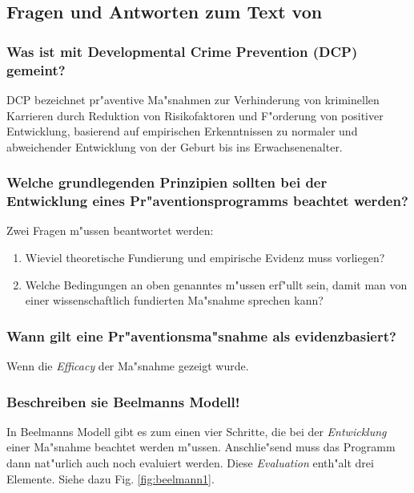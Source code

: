 \subsection{Fragen und Antworten zum Text von \textcite{beelmann_scientific_2012}}
\subsubsection{Was ist mit Developmental Crime Prevention (DCP) gemeint?}
DCP bezeichnet pr"aventive Ma"snahmen zur Verhinderung von kriminellen Karrieren durch Reduktion von Risikofaktoren und F"orderung von positiver Entwicklung, basierend auf empirischen Erkenntnissen zu normaler und abweichender Entwicklung von der Geburt bis ins Erwachsenenalter.

\subsubsection{Welche grundlegenden Prinzipien sollten bei der Entwicklung eines Pr"aventionsprogramms beachtet werden?}
Zwei Fragen m"ussen beantwortet werden:
\begin{enumerate}
        \item Wieviel theoretische Fundierung und empirische Evidenz muss vorliegen?
        \item Welche Bedingungen an oben genanntes m"ussen erf"ullt sein, damit man von einer wissenschaftlich fundierten Ma"snahme sprechen kann?
\end{enumerate}

\subsubsection{Wann gilt eine Pr"aventionsma"snahme als evidenzbasiert?}
Wenn die \emph{Efficacy} der Ma"snahme gezeigt wurde.

\subsubsection{Beschreiben sie Beelmanns Modell!}
In Beelmanns Modell gibt es zum einen vier Schritte, die bei der \emph{Entwicklung} einer Ma"snahme beachtet werden m"ussen. Anschlie"send muss das Programm dann nat"urlich auch noch evaluiert werden. Diese \emph{Evaluation} enth"alt drei Elemente. Siehe dazu Fig. \ref{fig:beelmann1}.

